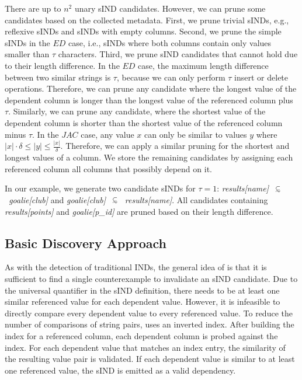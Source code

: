 There are up to $n^2$ unary sIND candidates.
However, we can prune some candidates based on the collected metadata.
First, we prune trivial sINDs, e.g., reflexive sINDs and sINDs with empty columns.
Second, we prune the simple sINDs in the $ED$ case, i.e., sINDs where both columns contain only values smaller than $\tau$ characters.
Third, we prune sIND candidates that cannot hold due to their length difference.
In the $ED$ case, the maximum length difference between two similar strings is $\tau$, because we can only perform $\tau$ insert or delete operations.
Therefore, we can prune any candidate where the longest value of the dependent column is longer than the longest value of the referenced column plus $\tau$.
Similarly, we can prune any candidate, where the shortest value of the dependent column is shorter than the shortest value of the referenced column minus $\tau$.
In the $JAC$ case, any value $x$ can only be similar to values $y$ where $|x| \cdot \delta \leq |y| \leq \frac{|x|}{\delta}$.
Therefore, we can apply a similar pruning for the shortest and longest values of a column.
We store the remaining candidates by assigning each referenced column all columns that possibly depend on it.

In our example, we generate two candidate sINDs for $\tau = 1$: \mbox{\emph{results[name]~$\simIND{}$~goalie[club]}} and  \mbox{\emph{goalie[club]~$\simIND{}$~results[name]}}.
All candidates containing \mbox{\emph{results[points]}} and \mbox{\emph{goalie[p\_id]}} are pruned based on their length difference.

\subsection{Basic Discovery Approach}
\label{section:impl:sawfish}
As with the detection of traditional INDs, the general idea of \sawfish is that it is sufficient to find a single counterexample to invalidate an sIND candidate.
Due to the universal quantifier in the sIND definition, there needs to be at least one similar referenced value for each dependent value.
However, it is infeasible to directly compare every dependent value to every referenced value.
To reduce the number of comparisons of string pairs, \sawfish uses an inverted index.
After building the index for a referenced column, each dependent column is probed against the index.
For each dependent value that matches an index entry, the similarity of the resulting value pair is validated.
If each dependent value is similar to at least one referenced value, the sIND is emitted as a valid dependency.


